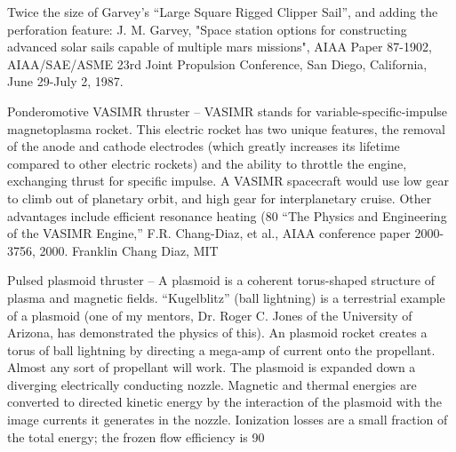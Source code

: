 \documentclass[a4paper]{book}
\begin{document}
Twice the size of Garvey’s “Large Square Rigged Clipper Sail”, and adding the perforation feature: J. M. Garvey, "Space station options for constructing advanced solar sails capable of multiple mars missions", AIAA Paper 87-1902, AIAA/SAE/ASME 23rd Joint Propulsion Conference, San Diego, California, June 29-July 2, 1987.
 
Ponderomotive VASIMR thruster – VASIMR stands for variable-specific-impulse magnetoplasma rocket.  This electric rocket has two unique features, the removal of the anode and cathode electrodes (which greatly increases its lifetime compared to other electric rockets) and the ability to throttle the engine, exchanging thrust for specific impulse. A VASIMR spacecraft would use low gear to climb out of planetary orbit, and high gear for interplanetary cruise. Other advantages include efficient resonance heating (80%
 “The Physics and Engineering of the VASIMR Engine,” F.R. Chang-Diaz, et al., AIAA conference paper 2000-3756, 2000. Franklin Chang Diaz, MIT
 
Pulsed plasmoid thruster – A plasmoid is a coherent torus-shaped structure of plasma and magnetic fields. “Kugelblitz” (ball lightning) is a terrestrial example of a plasmoid (one of my mentors, Dr. Roger C. Jones of the University of Arizona, has demonstrated the physics of this).  An plasmoid rocket creates a torus of ball lightning by directing a mega-amp of current onto the propellant. Almost any sort of propellant will work.  The plasmoid is expanded down a diverging electrically conducting nozzle. Magnetic and thermal energies are converted to directed kinetic energy by the interaction of the plasmoid with the image currents it generates in the nozzle. Ionization losses are a small fraction of the total energy; the frozen flow efficiency is 90%
 
\end{document}
